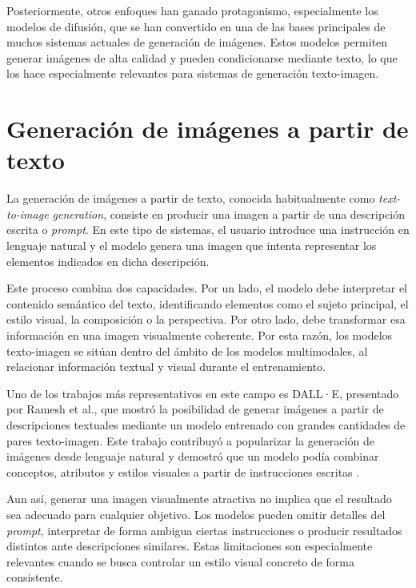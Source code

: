 \documentclass[a4paper,11pt,titlepage]{scrbook}
\begin{document}
\medskip

Posteriormente, otros enfoques han ganado protagonismo, especialmente los modelos de difusión, que se han convertido en una de las bases principales de muchos sistemas actuales de generación de imágenes. Estos modelos permiten generar imágenes de alta calidad y pueden condicionarse mediante texto, lo que los hace especialmente relevantes para sistemas de generación texto-imagen.

\section{Generación de imágenes a partir de texto}

La generación de imágenes a partir de texto, conocida habitualmente como \textit{text-to-image generation}, consiste en producir una imagen a partir de una descripción escrita o \textit{prompt}. En este tipo de sistemas, el usuario introduce una instrucción en lenguaje natural y el modelo genera una imagen que intenta representar los elementos indicados en dicha descripción.

\medskip

Este proceso combina dos capacidades. Por un lado, el modelo debe interpretar el contenido semántico del texto, identificando elementos como el sujeto principal, el estilo visual, la composición o la perspectiva. Por otro lado, debe transformar esa información en una imagen visualmente coherente. Por esta razón, los modelos texto-imagen se sitúan dentro del ámbito de los modelos multimodales, al relacionar información textual y visual durante el entrenamiento.

\medskip

Uno de los trabajos más representativos en este campo es DALL·E, presentado por Ramesh et al., que mostró la posibilidad de generar imágenes a partir de descripciones textuales mediante un modelo entrenado con grandes cantidades de pares texto-imagen. Este trabajo contribuyó a popularizar la generación de imágenes desde lenguaje natural y demostró que un modelo podía combinar conceptos, atributos y estilos visuales a partir de instrucciones escritas \cite{ramesh2021zeroshot}.

\medskip

Aun así, generar una imagen visualmente atractiva no implica que el resultado sea adecuado para cualquier objetivo. Los modelos pueden omitir detalles del \textit{prompt}, interpretar de forma ambigua ciertas instrucciones o producir resultados distintos ante descripciones similares. Estas limitaciones son especialmente relevantes cuando se busca controlar un estilo visual concreto de forma consistente.
\end{document}
